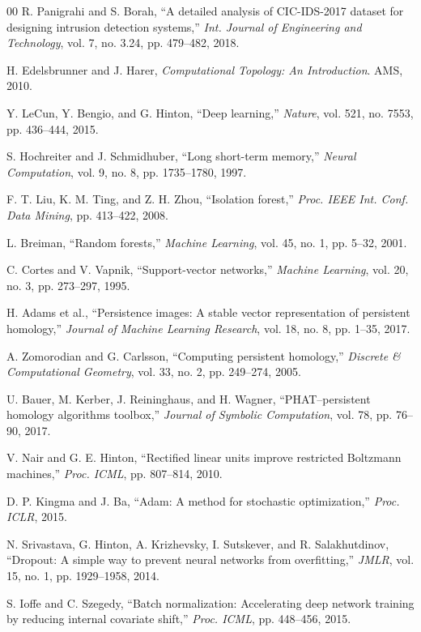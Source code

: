 \documentclass[conference]{IEEEtran}
\begin{document}
\begin{thebibliography}{00}
 R. Panigrahi and S. Borah, ``A detailed analysis of CIC-IDS-2017 dataset for designing intrusion detection systems,'' \textit{Int. Journal of Engineering and Technology}, vol. 7, no. 3.24, pp. 479--482, 2018.

 H. Edelsbrunner and J. Harer, \textit{Computational Topology: An Introduction}. AMS, 2010.

 Y. LeCun, Y. Bengio, and G. Hinton, ``Deep learning,'' \textit{Nature}, vol. 521, no. 7553, pp. 436--444, 2015.

 S. Hochreiter and J. Schmidhuber, ``Long short-term memory,'' \textit{Neural Computation}, vol. 9, no. 8, pp. 1735--1780, 1997.

 F. T. Liu, K. M. Ting, and Z. H. Zhou, ``Isolation forest,'' \textit{Proc. IEEE Int. Conf. Data Mining}, pp. 413--422, 2008.

 L. Breiman, ``Random forests,'' \textit{Machine Learning}, vol. 45, no. 1, pp. 5--32, 2001.

 C. Cortes and V. Vapnik, ``Support-vector networks,'' \textit{Machine Learning}, vol. 20, no. 3, pp. 273--297, 1995.

 H. Adams et al., ``Persistence images: A stable vector representation of persistent homology,'' \textit{Journal of Machine Learning Research}, vol. 18, no. 8, pp. 1--35, 2017.

 A. Zomorodian and G. Carlsson, ``Computing persistent homology,'' \textit{Discrete \& Computational Geometry}, vol. 33, no. 2, pp. 249--274, 2005.

 U. Bauer, M. Kerber, J. Reininghaus, and H. Wagner, ``PHAT--persistent homology algorithms toolbox,'' \textit{Journal of Symbolic Computation}, vol. 78, pp. 76--90, 2017.

 V. Nair and G. E. Hinton, ``Rectified linear units improve restricted Boltzmann machines,'' \textit{Proc. ICML}, pp. 807--814, 2010.

 D. P. Kingma and J. Ba, ``Adam: A method for stochastic optimization,'' \textit{Proc. ICLR}, 2015.

 N. Srivastava, G. Hinton, A. Krizhevsky, I. Sutskever, and R. Salakhutdinov, ``Dropout: A simple way to prevent neural networks from overfitting,'' \textit{JMLR}, vol. 15, no. 1, pp. 1929--1958, 2014.

 S. Ioffe and C. Szegedy, ``Batch normalization: Accelerating deep network training by reducing internal covariate shift,'' \textit{Proc. ICML}, pp. 448--456, 2015.


\end{thebibliography}
\end{document}
